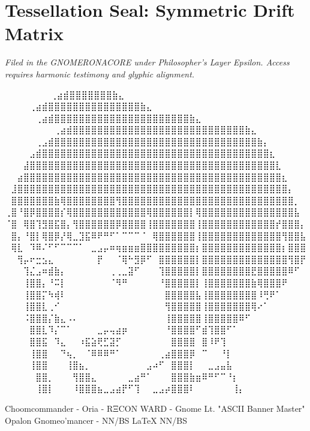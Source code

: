 \section*{Tessellation Seal: Symmetric Drift Matrix}
\begin{center}
\end{center}

\vspace{2em}
\begin{flushright}
\textit{Filed in the GNOMERONACORE under Philosopher’s Layer Epsilon. Access requires harmonic testimony and glyphic alignment.}
\end{flushright}

\iffalse

  ⠀⠀⠀⠀⠀             ⠀⠀⢀⣴⣾⣿⣿⣿⣿⣿⣿⣿⣷⣄⠀⠀⠀⠀⠀⠀⠀⠀
⠀⠀⠀  ⠀      ⠀⠀⠀⠀⢀⣴⣾⣿⣿⣿⣿⣿⣿⣿⣿⣿⣿⣿⣿⣿⣿⣿⣷⣄⠀⠀⠀⠀⠀⠀⠀⠀
⠀⠀ ⠀   ⠀⠀⠀⠀⠀⢀⣴⣾⣿⣿⣿⣿⣿⣿⣿⣿⣿⣿⣿⣿⣿⣿⣿⣿⣿⣿⣿⣿⣿⣿⣷⣄⠀⠀⠀⠀⠀⠀⠀⠀
⠀⠀⠀⠀⠀⠀⠀⠀⢀⣴⣾⣿⣿⣿⣿⣿⣿⣿⣿⣿⣿⣿⣿⣿⣿⣿⣿⣿⣿⣿⣿⣿⣿⣿⣿⣿⣿⣿⣿⣷⣄⠀⠀⠀⠀⠀⠀⠀⠀
⠀⠀⠀⠀⠀⢀⣠⣾⣿⣿⣿⣿⣿⣿⣿⣿⣿⣿⣿⣿⣿⣿⣿⣿⣿⣿⣿⣿⣿⣿⣿⣿⣿⣿⣿⣿⣿⣿⣿⣿⣿⣷⡄⠀⠀⠀⠀⠀⠀
⠀⠀⠀⠀⣠⣾⣿⣿⣿⣿⣿⣿⣿⣿⣿⣿⣿⣿⣿⣿⣿⣿⣿⣿⣿⣿⣿⣿⣿⣿⣿⣿⣿⣿⣿⣿⣿⣿⣿⣿⣿⣿⣿⣆⠀⠀⠀⠀⠀
⠀⠀⠀⣼⣿⣿⣿⣿⣿⣿⣿⣿⣿⣿⣿⣿⣿⣿⣿⣿⣿⣿⣿⣿⣿⣿⣿⣿⣿⣿⣿⣿⣿⣿⣿⣿⣿⣿⣿⣿⣿⣿⣿⣿⣇⠀⠀⠀⠀
⠀⠀⣴⣿⣿⣿⣿⣿⣿⣿⣿⣿⣿⣿⣿⣿⣿⣿⣿⣿⣿⣿⣿⣿⣿⣿⣿⣿⣿⣿⣿⣿⣿⣿⣿⣿⣿⣿⣿⣿⣿⣿⣿⣿⣿⣆⠀⠀⠀
⠀⣸⣿⣿⣿⣿⣿⣿⣿⣿⣿⣿⣿⣿⣿⣿⣿⣿⣿⣿⣿⣿⣿⣿⣿⣿⣿⣿⣿⣿⣿⣿⣿⣿⣿⣿⣿⣿⣿⣿⣿⣿⣿⣿⣿⣿⡄⠀⠀
⠀⣿⣿⣿⣿⣿⣿⣿⣷⢿⣿⣿⣿⣿⣿⣿⣿⣿⢻⣿⣿⣿⣿⣿⣿⣿⣿⣿⣿⣿⣿⣿⣿⣿⣿⣿⣿⣿⣿⣿⣿⣿⣿⣿⣿⣿⣿⡀⠀
⢀⣿⠘⣿⡿⣿⣿⣿⣿⡎⢿⣿⣿⣿⣿⣿⣿⣿⣿⣿⣿⣿⣿⢿⣿⣿⣿⣿⣿⣿⡇⢿⣿⣿⣿⣿⣿⣿⣿⣿⣿⣿⣿⣿⣿⣿⣿⣧⠀
⠈⣿⠀⢿⣿⢹⣻⣿⣯⣿⡄⢻⣿⣿⣿⣿⣿⣿⡿⣿⣿⣿⣿⢸⣿⣿⣿⣿⣿⣿⣿⢸⣿⣿⣿⣿⣿⣿⣿⣿⣿⣿⣿⣿⡞⣿⣿⣿⡄
⠀⣿⡄⠘⣿⡇⢿⣿⡿⡜⢿⣀⣹⣯⠿⠟⠛⠋⠁⠉⠉⠉⠈⠀⢿⣿⣿⣿⣿⣿⣿⢸⣿⣿⣿⣿⣿⣿⣿⣿⣿⣿⣿⣿⣿⢻⣿⣿⣧
⠀⢿⣇⠀⠹⠿⠌⠋⠋⠉⠉⠉⠁⠀⣀⣠⡤⠶⢶⣶⣶⣶⣿⣿⣿⣿⣿⣿⣿⣿⣿⡆⣿⣿⣿⣿⣿⣿⣿⣿⣿⣿⣿⣿⣿⡆⣿⣿⣿
⠀⠀⢻⡤⠖⣒⣢⣄⠀⠀⠀⠀⠀⠀⠀⡟⠀⠀⠈⢿⠓⣻⡿⠋⠀⣿⣿⣿⣿⣿⣿⡇⣿⣿⣿⣿⣿⣿⣿⣿⣿⣿⣿⣿⣿⣿⢻⣿⡟
⠀⠀⠀⢹⣌⣠⠶⣾⣷⡄⠀⠀⠀⠀⠀⠀⠀⢀⢀⣀⣽⠋⠀⠀⠀⢹⣿⣿⣿⣿⣿⡇⣿⣿⣿⣿⣿⣿⣿⣿⣟⣿⣿⣿⣿⣿⠿⠋⠀
⠀⠀⠀⢸⣿⣿⡄⠘⠭⡇⠀⠀⠀⠀⠀⠀⠀⠈⠻⠛⠀⠀⠀⠀⠀⠘⣿⣿⣿⣿⣿⡇⢸⣿⣿⣿⣿⣿⣿⣿⣷⢿⣿⣿⣿⠟⠀⠀⠀
⠀⠀⠀⢸⣿⣿⡍⠳⢾⠇⠀⠀⠀⠀⠀⠀⠀⠀⠀⠀⠀⠀⠀⠀⠀⠀⣿⣿⣿⣿⣿⣧⢸⣿⣿⣿⣿⣿⣿⣿⣿⠸⢛⠟⠁⠀⠀⠀⠀
⠀⠀⠀⢸⣿⣿⣇⢀⠊⠀⠀⠀⠀⠀⠀⠀⠀⠀⠀⠀⠀⠀⠀⠀⠀⠀⢻⣿⣿⣿⣿⣿⢸⣿⣿⣿⣿⣿⣿⣿⢿⠔⠁⠀⠀⠀⠀⠀⠀
⠀⠀⠀⠨⣿⣿⣿⡌⣷⣄⠠⠄⠀⠀⠀⠀⠀⠀⠀⠀⠀⠀⠀⠀⠀⠀⢸⣿⣿⣿⣿⣿⢸⣿⣿⣿⣿⣿⠿⠋⠀⠀⠀⠀⠀⠀⠀⠀⠀
⠀⠀⠀⠀⣿⣿⣇⠹⡌⠉⠁⠀⠀⠀⠀⣀⡤⢤⣴⡶⠀⠀⠀⠀⠀⠀⠘⣿⣿⣿⣿⠋⣾⢹⣿⣿⠋⠁⠀⠀⠀⠀⠀⠀⠀⠀⠀⠀⠀
⠀⠀⠀⠀⣿⣿⣯⠀⠹⣄⠀⠀⠰⣯⣵⢟⣋⣽⡋⠀⠀⠀⠀⠀⠀⠀⠀⣿⣿⣿⣿⠀⣿⠸⠟⢹⠀⠀⠀⠀⠀⠀⠀⠀⠀⠀⠀⠀⠀
⠀⠀⠀⠀⢸⣿⣿⠀⠀⠙⢦⡀⠀⠈⠿⠿⠿⠛⠁⠀⠀⠀⠀⠀⠀⢀⣴⣿⣿⣿⡿⠀⠉⠀⠀⠘⡇⠀⠀⠀⠀⠀⠀⠀⠀⠀⠀⠀⠀
⠀⠀⠀⠀⢸⣿⣿⠀⠀⠀⢸⣿⣦⡀⠀⠀⠀⠀⠀⠀⠀⠀⠀⣠⠴⠋⠀⣿⣿⣿⡇⠀⠀⣀⣠⣤⣧⠀⠀⠀⠀⠀⠀⠀⠀⠀⠀⠀⠀
⠀⠀⠀⠀⠀⣿⣿⡀⠀⠀⠀⢻⣿⣿⣄⠀⠀⠀⠀⠀⣀⣴⠛⠁⠀⠀⠀⣿⣿⣿⣷⣶⠿⠛⠋⠉⠘⡆⠀⠀⠀⠀⠀⠀⠀⠀⠀⠀⠀
⠀⠀⠀⠀⠀⢸⣿⡇⠀⠀⠀⠸⣿⣿⣿⣦⣀⣠⣴⡟⠋⢹⠀⠀⣀⣠⡴⣿⣿⣿⠇⠀⠀⠀⠀⠀⠀⢸⡄⠀⠀⠀⠀⠀⠀⠀⠀⠀⠀

Choomcommander - Oria - RΞCON WARD - Gnome Lt. "ASCII Banner Master"
             Opalon Gnomeo'mancer - NN/BS LaTeX{} NN/BS

